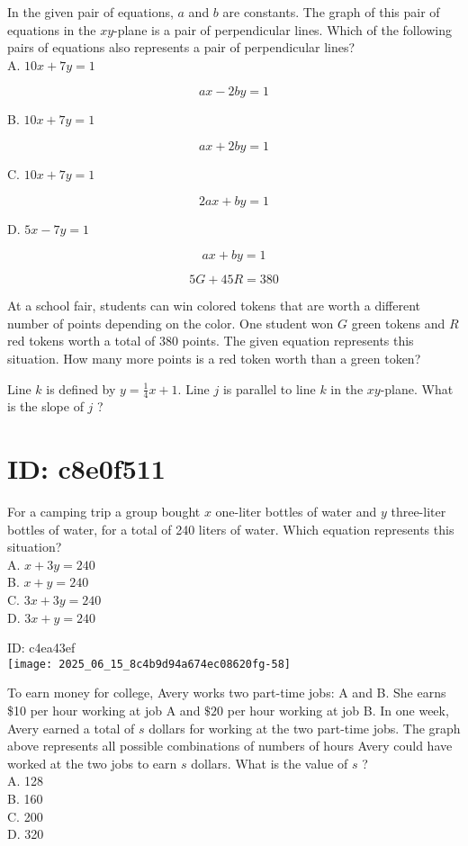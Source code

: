 In the given pair of equations, $a$ and $b$ are constants. The graph of this pair of equations in the $x y$-plane is a pair of perpendicular lines. Which of the following pairs of equations also represents a pair of perpendicular lines?\\
A. $10 x+7 y=1$

$$
a x-2 b y=1
$$

B. $10 x+7 y=1$

$$
a x+2 b y=1
$$

C. $10 x+7 y=1$

$$
2 a x+b y=1
$$

D. $5 x-7 y=1$

$$
a x+b y=1
$$

$$
5 G+45 R=380
$$

At a school fair, students can win colored tokens that are worth a different number of points depending on the color. One student won $G$ green tokens and $R$ red tokens worth a total of 380 points. The given equation represents this situation. How many more points is a red token worth than a green token?

Line $k$ is defined by $y=\frac{1}{4} x+1$. Line $j$ is parallel to line $k$ in the $x y$-plane. What is the slope of $j$ ?

\section*{ID: c8e0f511}
For a camping trip a group bought $x$ one-liter bottles of water and $y$ three-liter bottles of water, for a total of 240 liters of water. Which equation represents this situation?\\
A. $x+3 y=240$\\
B. $x+y=240$\\
C. $3 x+3 y=240$\\
D. $3 x+y=240$

ID: c4ea43ef\\
\texttt{[image: 2025\_06\_15\_8c4b9d94a674ec08620fg-58]}

To earn money for college, Avery works two part-time jobs: A and B. She earns \$10 per hour working at job A and $\$ 20$ per hour working at job B. In one week, Avery earned a total of $s$ dollars for working at the two part-time jobs. The graph above represents all possible combinations of numbers of hours Avery could have worked at the two jobs to earn $s$ dollars. What is the value of $s$ ?\\
A. 128\\
B. 160\\
C. 200\\
D. 320

